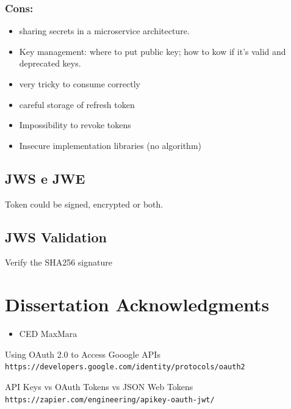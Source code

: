 \documentclass[11pt]{style}
\begin{document}
\subsubsection{Cons:}
\begin{itemize}
    \item sharing secrets in a microservice architecture.
    \item Key management: where to put public key; how to kow if it's valid and
        deprecated keys.
    \item very tricky to consume correctly
    \item careful storage of refresh token
    \item Impossibility to revoke tokens
    \item Insecure implementation libraries (no algorithm)
\end{itemize}

\subsection{JWS e JWE}
Token could be signed, encrypted or both.

\subsection{JWS Validation}
Verify the SHA256 signature

\section{Dissertation Acknowledgments}
\begin{itemize}
    \item CED MaxMara
\end{itemize}

\begin{thebibliography}{9}
    Using OAuth 2.0 to Access Gooogle APIs
    \\
    \texttt{https://developers.google.com/identity/protocols/oauth2}

    API Keys vs OAuth Tokens vs JSON Web Tokens
    \\
    \texttt{https://zapier.com/engineering/apikey-oauth-jwt/}

\end{thebibliography}

\newpage
\end{document}
